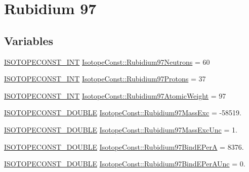 \hypertarget{group___isotope_const-_rubidium-_rb97}{}\section{Rubidium 97}
\label{group___isotope_const-_rubidium-_rb97}
\subsection*{Variables}
\begin{DoxyCompactItemize}
\item 
\mbox{\hyperlink{group___isotope_const-_macros_ga5f18360b3e99483a35c32d789e62621c}{I\+S\+O\+T\+O\+P\+E\+C\+O\+N\+S\+T\+\_\+\+I\+NT}} \mbox{\hyperlink{group___isotope_const-_rubidium-_rb97_ga368dac949cf9b2c9cf05f7130b2a04c6}{Isotope\+Const\+::\+Rubidium97\+Neutrons}} = 60
\item 
\mbox{\hyperlink{group___isotope_const-_macros_ga5f18360b3e99483a35c32d789e62621c}{I\+S\+O\+T\+O\+P\+E\+C\+O\+N\+S\+T\+\_\+\+I\+NT}} \mbox{\hyperlink{group___isotope_const-_rubidium-_rb97_ga19179195b926dfec0ca12e27c35bd386}{Isotope\+Const\+::\+Rubidium97\+Protons}} = 37
\item 
\mbox{\hyperlink{group___isotope_const-_macros_ga5f18360b3e99483a35c32d789e62621c}{I\+S\+O\+T\+O\+P\+E\+C\+O\+N\+S\+T\+\_\+\+I\+NT}} \mbox{\hyperlink{group___isotope_const-_rubidium-_rb97_ga24678db063dc7a5b808453cf4c1555b0}{Isotope\+Const\+::\+Rubidium97\+Atomic\+Weight}} = 97
\item 
\mbox{\hyperlink{group___isotope_const-_macros_ga8f45a7272ce02c0b4c65c44636ed719a}{I\+S\+O\+T\+O\+P\+E\+C\+O\+N\+S\+T\+\_\+\+D\+O\+U\+B\+LE}} \mbox{\hyperlink{group___isotope_const-_rubidium-_rb97_ga52166e0a208c4f3b1c4b1be0e310ec63}{Isotope\+Const\+::\+Rubidium97\+Mass\+Exc}} = -\/58519.
\item 
\mbox{\hyperlink{group___isotope_const-_macros_ga8f45a7272ce02c0b4c65c44636ed719a}{I\+S\+O\+T\+O\+P\+E\+C\+O\+N\+S\+T\+\_\+\+D\+O\+U\+B\+LE}} \mbox{\hyperlink{group___isotope_const-_rubidium-_rb97_ga385c18ae7dbb2995bff802e0be5bcfd7}{Isotope\+Const\+::\+Rubidium97\+Mass\+Exc\+Unc}} = 1.
\item 
\mbox{\hyperlink{group___isotope_const-_macros_ga8f45a7272ce02c0b4c65c44636ed719a}{I\+S\+O\+T\+O\+P\+E\+C\+O\+N\+S\+T\+\_\+\+D\+O\+U\+B\+LE}} \mbox{\hyperlink{group___isotope_const-_rubidium-_rb97_ga66fa5b80091edc9521c8852e840e4d7f}{Isotope\+Const\+::\+Rubidium97\+Bind\+E\+PerA}} = 8376.
\item 
\mbox{\hyperlink{group___isotope_const-_macros_ga8f45a7272ce02c0b4c65c44636ed719a}{I\+S\+O\+T\+O\+P\+E\+C\+O\+N\+S\+T\+\_\+\+D\+O\+U\+B\+LE}} \mbox{\hyperlink{group___isotope_const-_rubidium-_rb97_ga53ed079da86d9a7ae910091139d2ba17}{Isotope\+Const\+::\+Rubidium97\+Bind\+E\+Per\+A\+Unc}} = 0.

\end{DoxyCompactItemize}
